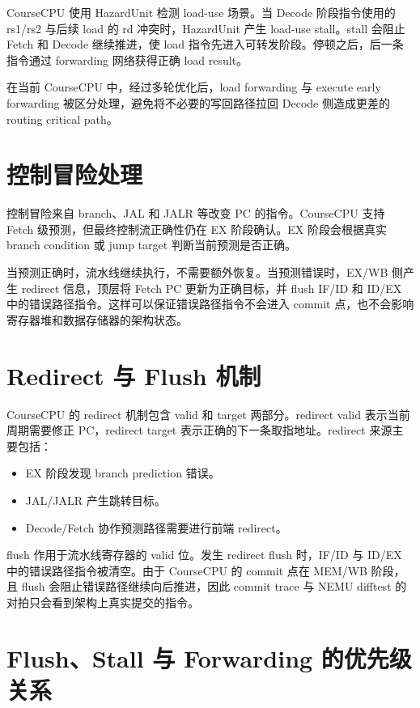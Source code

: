 \documentclass[UTF8,a4paper,12pt]{ctexrep}
\begin{document}
CourseCPU 使用 HazardUnit 检测 load-use 场景。当 Decode 阶段指令使用的 rs1/rs2 与后续 load 的 rd 冲突时，HazardUnit 产生 load-use stall。stall 会阻止 Fetch 和 Decode 继续推进，使 load 指令先进入可转发阶段。停顿之后，后一条指令通过 forwarding 网络获得正确 load result。

在当前 CourseCPU 中，经过多轮优化后，load forwarding 与 execute early forwarding 被区分处理，避免将不必要的写回路径拉回 Decode 侧造成更差的 routing critical path。

\section{控制冒险处理}

控制冒险来自 branch、JAL 和 JALR 等改变 PC 的指令。CourseCPU 支持 Fetch 级预测，但最终控制流正确性仍在 EX 阶段确认。EX 阶段会根据真实 branch condition 或 jump target 判断当前预测是否正确。

当预测正确时，流水线继续执行，不需要额外恢复。当预测错误时，EX/WB 侧产生 redirect 信息，顶层将 Fetch PC 更新为正确目标，并 flush IF/ID 和 ID/EX 中的错误路径指令。这样可以保证错误路径指令不会进入 commit 点，也不会影响寄存器堆和数据存储器的架构状态。

\section{Redirect 与 Flush 机制}

CourseCPU 的 redirect 机制包含 valid 和 target 两部分。redirect valid 表示当前周期需要修正 PC，redirect target 表示正确的下一条取指地址。redirect 来源主要包括：

\begin{itemize}
  \item EX 阶段发现 branch prediction 错误。
  \item JAL/JALR 产生跳转目标。
  \item Decode/Fetch 协作预测路径需要进行前端 redirect。
\end{itemize}

flush 作用于流水线寄存器的 valid 位。发生 redirect flush 时，IF/ID 与 ID/EX 中的错误路径指令被清空。由于 CourseCPU 的 commit 点在 MEM/WB 阶段，且 flush 会阻止错误路径继续向后推进，因此 commit trace 与 NEMU difftest 的对拍只会看到架构上真实提交的指令。

\section{Flush、Stall 与 Forwarding 的优先级关系}
\end{document}
